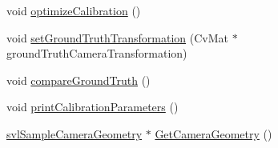 \begin{DoxyCompactItemize}
\item 
void \hyperlink{classsvl_c_c_calibration_grid_ac92fde3ddfa68b36159a6a69d64f2d0f}{optimize\-Calibration} ()
\item 
void \hyperlink{classsvl_c_c_calibration_grid_a2b38609fe50a0de989d81fdfbac12839}{set\-Ground\-Truth\-Transformation} (Cv\-Mat $\ast$ground\-Truth\-Camera\-Transformation)
\item 
void \hyperlink{classsvl_c_c_calibration_grid_a24446cf287b96d1b8dabe3a5561f9db3}{compare\-Ground\-Truth} ()
\item 
void \hyperlink{classsvl_c_c_calibration_grid_a92d222b6bcb5b747b343d8c35e2994ce}{print\-Calibration\-Parameters} ()
\item 
\hyperlink{classsvl_sample_camera_geometry}{svl\-Sample\-Camera\-Geometry} $\ast$ \hyperlink{classsvl_c_c_calibration_grid_af638b388dc77d852572e574bcf43a09c}{Get\-Camera\-Geometry} ()
\end{DoxyCompactItemize}
